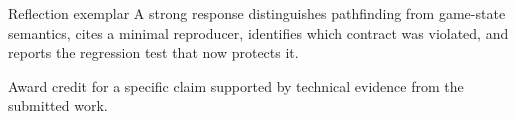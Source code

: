\documentclass[aspectratio=169,11pt]{beamer}
\begin{document}
\begin{frame}{Reflection exemplar}
\small
\answerlabel A strong response distinguishes pathfinding from game-state semantics, cites a minimal reproducer, identifies which contract was violated, and reports the regression test that now protects it.

\vspace{0.25cm}
\gradinglabel Award credit for a specific claim supported by technical evidence from the submitted work.
\end{frame}
\end{document}
